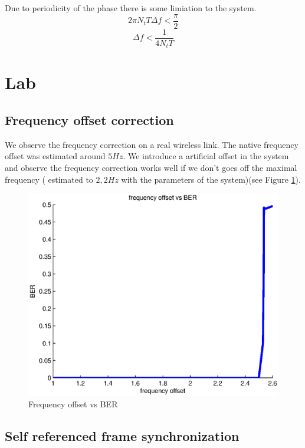 \documentclass{article}
\begin{document}
		Due to periodicity of the phase there is some limiation to the system. 
		$$ 2\pi N_t T \Delta f < \frac{ \pi}{2}$$
		$$ \Delta f < \frac{1}{4 N_t T}$$
			
\section{Lab}
	\subsection{Frequency offset correction}
		We observe the frequency correction on a real wireless link. The native frequency offset was estimated around $5Hz$. We introduce a artificial offset in the system and observe the frequency correction works well if we don't goes off the maximal frequency ( estimated to $2,2Hz$ with the parameters of the system)(see Figure \ref{BER}).
		\begin{figure}[h!]
			\centering
			\includegraphics[width = 0.5 \textwidth]{ber.eps}
			\caption{Frequency offset vs BER \label{BER}}
		\end{figure}	
	\subsection{Self referenced frame synchronization}
\end{document}
